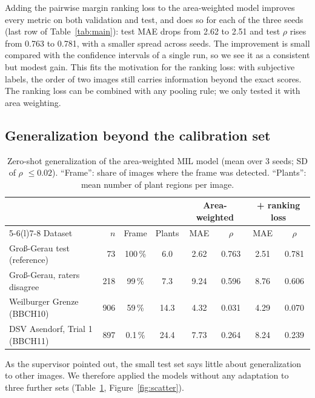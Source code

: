 Adding the pairwise margin ranking loss to the area-weighted model improves every metric on both
validation and test, and does so for each of the three seeds (last row of Table~\ref{tab:main}):
test MAE drops from 2.62 to 2.51 and test $\rho$ rises from 0.763 to 0.781, with a smaller spread
across seeds. The improvement is small compared with the confidence intervals of a single run, so
we see it as a consistent but modest gain. This fits the motivation for the
ranking loss: with subjective labels, the order of two images still carries information beyond
the exact scores. The ranking loss can be combined with any pooling rule; we only tested it with
area weighting.

\subsection{Generalization beyond the calibration set}
\label{sec:res-ood}

\begin{table}[tb]
\centering
\small
\caption{Zero-shot generalization of the area-weighted MIL model (mean over 3 seeds; SD of
$\rho$ $\leq 0.02$). ``Frame'': share of images where the frame was detected. ``Plants'': mean
number of plant regions per image.}
\label{tab:ood}
\begin{tabular}{@{}lrcccccc@{}}
\toprule
 & & & & \multicolumn{2}{c}{Area-weighted} & \multicolumn{2}{c}{+ ranking loss} \\
\cmidrule(lr){5-6}\cmidrule(l){7-8}
Dataset & $n$ & Frame & Plants & MAE & $\rho$ & MAE & $\rho$ \\
\midrule
Gro\ss-Gerau test (reference)            & 73  & 100\,\% & 6.0  & 2.62 & 0.763 & 2.51 & 0.781 \\
Gro\ss-Gerau, raters disagree            & 218 & 99\,\%  & 7.3  & 9.24 & 0.596 & 8.76 & 0.606 \\
Weilburger Grenze (BBCH10)               & 906 & 59\,\%  & 14.3 & 4.32 & 0.031 & 4.29 & 0.070 \\
DSV Asendorf, Trial 1 (BBCH11)           & 897 & 0.1\,\% & 24.4 & 7.73 & 0.264 & 8.24 & 0.239 \\
\bottomrule
\end{tabular}
\end{table}

As the supervisor pointed out, the small test set says little about generalization to other
images. We therefore applied the models without any adaptation to three further sets
(Table~\ref{tab:ood}, Figure~\ref{fig:scatter}).

